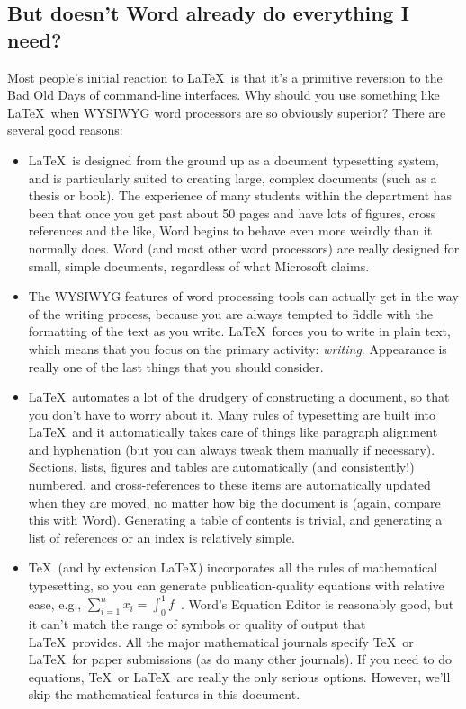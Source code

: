 \documentclass[12pt,a4paper,pdftex]{article}
\begin{document}
\subsection{But doesn't Word already do everything I need?}
\label{sec-Word}

Most people's initial reaction to \LaTeX\ is that it's a primitive reversion to the Bad Old Days of command-line interfaces. Why should you use something like \LaTeX\ when WYSIWYG word processors are so obviously superior? There are several good reasons:

\begin{itemize}

	\item \LaTeX\ is designed from the ground up as a document typesetting system, and is particularly suited to creating large, complex documents (such as a thesis or book). The experience of many students within the department has been that once you get past about 50 pages and have lots of figures, cross references and the like, Word begins to behave even more weirdly than it normally does. Word (and most other word processors) are really designed for small, simple documents, regardless of what Microsoft claims.
	
	\item The WYSIWYG features of word processing tools can actually get in the way of the writing process, because you are always tempted to fiddle with the formatting of the text as you write. \LaTeX\ forces you to write in plain text, which means that you focus on the primary activity: \emph{writing}. Appearance is really one of the last things that you should consider.
	
	\item \LaTeX\ automates a lot of the drudgery of constructing a document, so that you don't have to worry about it. Many rules of typesetting are built into \LaTeX\, and it automatically takes care of things like paragraph alignment and hyphenation (but you can always tweak them manually if necessary). Sections, lists, figures and tables are automatically (and consistently!) numbered, and cross-references to these items are automatically updated when they are moved, no matter how big the document is (again, compare this with Word). Generating a table of contents is trivial, and generating a list of references or an index is relatively simple.
	
	\item \TeX\ (and by extension \LaTeX) incorporates all the rules of mathematical typesetting, so you can generate publication-quality equations with relative ease, e.g., \(\sum_{i=1}^{n} x_{i} = \int_{0}^{1} f\)~\cite{UsersGuide}. Word's Equation Editor is reasonably good, but it can't match the range of symbols or quality of output that \LaTeX\ provides. All the major mathematical journals specify \TeX\ or \LaTeX\ for paper submissions (as do many other journals). If you need to do equations, \TeX\ or \LaTeX\ are really the only serious options. However, we'll skip the mathematical features in this document.
	

\end{itemize}
\end{document}
